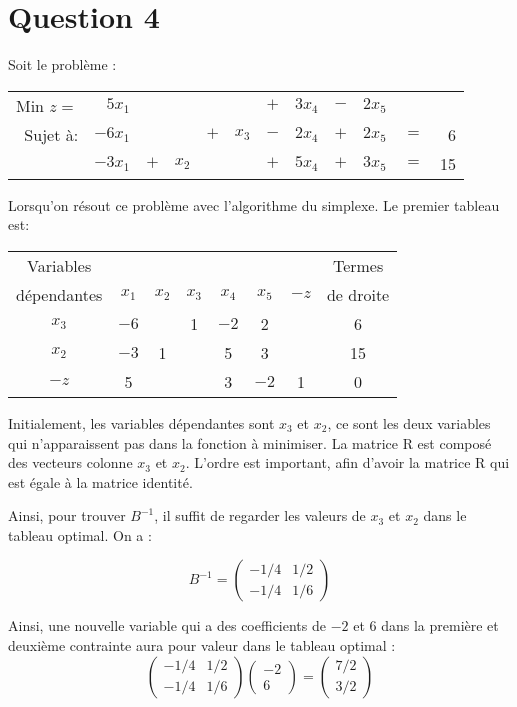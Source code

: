 \section{Question 4}

Soit le problème :

\begin{tabular}{@{}rrrrrrrrrrrr@{}}
	Min $z =$ &  $5x_1$ &     &       &     &       & $+$ & $3x_4$ & $-$ & $2x_5$ &     &    \\
	 Sujet à: & $-6x_1$ &     &       & $+$ & $x_3$ & $-$ & $2x_4$ & $+$ & $2x_5$ & $=$ &  6 \\
	          & $-3x_1$ & $+$ & $x_2$ &     &       & $+$ & $5x_4$ & $+$ & $3x_5$ & $=$ & 15
\end{tabular}

Lorsqu’on résout ce problème avec l’algorithme du simplexe. Le premier tableau est:

\begin{center}
	\begin{tabular}{|c|cccccc|c|}
		\hline
		 Variables  &         &         &         &         &         &      &  Termes   \\
		dépendantes & $x_{1}$ & $x_{2}$ & $x_{3}$ & $x_{4}$ & $x_{5}$ & $-z$ & de droite \\ \hline
		  $x_{3}$   &  $-6$   &         &    1    &  $-2$   &    2    &      &     6     \\
		  $x_{2}$   &  $-3$   &    1    &         &    5    &    3    &      &    15     \\ \hline
		   $-z$     &    5    &         &         &    3    &  $-2$   &  1   &     0     \\ \hline
	\end{tabular}
\end{center}

Initialement, les variables dépendantes sont $x_3$ et $x_2$, ce sont les deux variables qui n’apparaissent pas dans la fonction à minimiser. La matrice R est composé des vecteurs colonne $x_3$ et $x_2$. L’ordre est important, afin d’avoir la matrice R qui est égale à la matrice identité.

Ainsi, pour trouver $B^{-1}$, il suffit de regarder les valeurs de $x_3$ et $x_2$ dans le tableau optimal. On a :

\[
B^{-1} = 
\begin{pmatrix}
	-1/4 & 1/2 \\
	-1/4 & 1/6
\end{pmatrix}
\]

Ainsi, une nouvelle variable qui a des coefficients de $-2$ et 6 dans la première et deuxième contrainte aura pour valeur dans le tableau optimal :
\[
\begin{pmatrix}
	-1/4 & 1/2 \\
	-1/4 & 1/6
\end{pmatrix}
\begin{pmatrix}
	-2 \\
	6
\end{pmatrix}
=
\begin{pmatrix}
	7/2 \\
	3/2
\end{pmatrix}
\]

